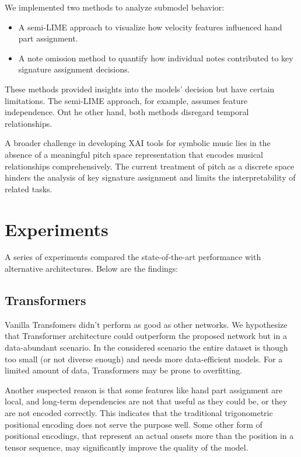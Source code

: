 We implemented two methods to analyze submodel behavior: \begin{itemize}
	\item A semi-LIME approach to visualize how velocity features influenced hand part assignment.
	\item A note omission method to quantify how individual notes contributed to key signature assignment decisions. \end{itemize}

These methods provided insights into the models' decision but have certain limitations. The semi-LIME approach, for example, assumes feature independence. Ont he other hand, both methods disregard temporal relationships.

A broader challenge in developing XAI tools for symbolic music lies in the absence of a meaningful pitch space representation that encodes musical relationships comprehensively. The current treatment of pitch as a discrete space hinders the analysis of key signature assignment and limits the interpretability of related tasks.

\section{Experiments}

A series of experiments compared the state-of-the-art performance with alternative architectures. Below are the findings:

\subsection{Transformers}

Vanilla Transfomers didn't perform as good as other networks. We hypothesize that Transformer architecture could outperform the proposed network but in a data-abundant scenario. In the considered scenario the entire dataset is though too small (or not diverse enough) and needs more data-efficient models. For a limited amount of data, Transformers may be prone to overfitting.

Another suspected reason is that some features like hand part assignment are local, and long-term dependencies are not that useful as they could be, or they are not encoded correctly. This indicates that the traditional trigonometric positional encoding does not serve the purpose well. Some other form of positional encodings, that represent an actual onsets more than the position in a tensor sequence, may significantly improve the quality of the model.


